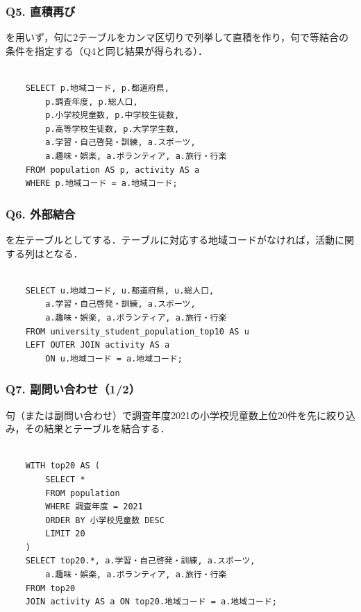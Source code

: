 \subsubsection*{Q5. 直積再び}
を用いず，句に2テーブルをカンマ区切りで列挙して直積を作り，句で等結合の条件を指定する（Q4と同じ結果が得られる）．
\begin{verbatim}

    SELECT p.地域コード, p.都道府県,
        p.調査年度, p.総人口,
        p.小学校児童数, p.中学校生徒数,
        p.高等学校生徒数, p.大学学生数,
        a.学習・自己啓発・訓練, a.スポーツ,
        a.趣味・娯楽, a.ボランティア, a.旅行・行楽
    FROM population AS p, activity AS a
    WHERE p.地域コード = a.地域コード;

\end{verbatim}

\subsubsection*{Q6. 外部結合}
を左テーブルとしてする．テーブルに対応する地域コードがなければ，活動に関する列はとなる．
\begin{verbatim}

    SELECT u.地域コード, u.都道府県, u.総人口,
        a.学習・自己啓発・訓練, a.スポーツ,
        a.趣味・娯楽, a.ボランティア, a.旅行・行楽
    FROM university_student_population_top10 AS u
    LEFT OUTER JOIN activity AS a
        ON u.地域コード = a.地域コード;

\end{verbatim}

\subsubsection*{Q7. 副問い合わせ（1/2）}
句（または副問い合わせ）で調査年度2021の小学校児童数上位20件を先に絞り込み，その結果とテーブルを結合する．
\begin{verbatim}

    WITH top20 AS (
        SELECT *
        FROM population
        WHERE 調査年度 = 2021
        ORDER BY 小学校児童数 DESC
        LIMIT 20
    )
    SELECT top20.*, a.学習・自己啓発・訓練, a.スポーツ,
        a.趣味・娯楽, a.ボランティア, a.旅行・行楽
    FROM top20
    JOIN activity AS a ON top20.地域コード = a.地域コード;

\end{verbatim}

